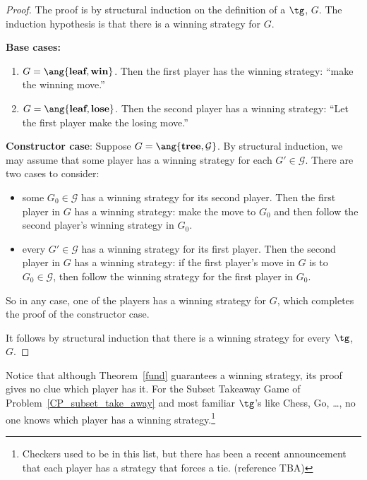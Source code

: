 \begin{definition}
\begin{proof}
The proof is by structural induction on the definition of a $\tg$, $G$.
The induction hypothesis is that there is a winning strategy for $G$.

\textbf{Base cases:}
\begin{enumerate}

\item $G=\ang{\textbf{leaf}, \textbf{win}}$.  Then the first player has the
 winning strategy: ``make the winning move.''

\item $G=\ang{\textbf{leaf}, \textbf{lose}}$.  Then the second player has a
 winning strategy: ``Let the first player make the losing move.''
\end{enumerate}

\textbf{Constructor case}: Suppose $G = \ang{\textbf{tree},\mathcal{G}}$.
By structural induction, we may assume that some player has a winning
strategy for each $G' \in \mathcal{G}$.  There are two cases to consider:
\begin{itemize}
\item some $G_0 \in \mathcal{G}$ has a winning strategy for its second
  player.  Then the first player in $G$ has a winning strategy: make the
  move to $G_0$ and then follow the second player's winning strategy in
  $G_0$.

\item every $G' \in \mathcal{G}$ has a winning strategy for its first
  player.  Then the second player in $G$ has a winning strategy: if the
  first player's move in $G$ is to $G_0 \in \mathcal{G}$, then follow the
  winning strategy for the first player in $G_0$.
\end{itemize}
So in any case, one of the players has a winning strategy for $G$, which
completes the proof of the constructor case.

It follows by structural induction that there is a winning strategy for
every $\tg$, $G$.
\end{proof}

Notice that although Theorem~\ref{fund} guarantees a winning strategy, its
proof gives no clue which player has it.  For the Subset Takeaway Game of
Problem~\ref{CP_subset_take_away} and most familiar $\tg$'s like Chess,
Go, \dots, no one knows which player has a winning
strategy.\footnote{Checkers used to be in this list, but there has been a
  recent announcement that each player has a strategy that forces a tie.
  (reference TBA)}


\end{definition}
